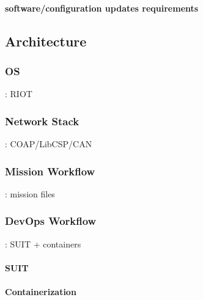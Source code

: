 \paragraph*{software/configuration updates requirements}

\subsection{Architecture}
\subsubsection{OS}: RIOT
\subsubsection{Network Stack}: COAP/LibCSP/CAN
\subsubsection{Mission Workflow}: mission files
\subsubsection{DevOps Workflow}: SUIT + containers
\paragraph*{SUIT}
\paragraph*{Containerization}

